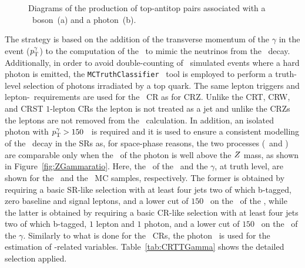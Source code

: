 		\begin{figure}[htpb]
		  \centering
		    \caption{Diagrams of the production of top-antitop pairs associated with a \Zboson\ boson~(a) and a photon~(b).}
		    \label{fig:ttZttGamma}
		\end{figure}

		The strategy is based on the addition of the transverse momentum of the $\gamma$ in the event ($p_{\mathrm{T}}^{\gamma}$) to the computation of the \met\ to mimic the neutrinos from the \Zboson\ decay. Additionally, in order to avoid double-counting of \ttbar\ simulated events where a hard photon is emitted, the \verb+MCTruthClassifier+~\cite{MCTruthClassifier} tool is employed to perform a truth-level selection of photons irradiated by a top quark. The same lepton triggers and lepton-\pt\ requirements are used for the \ttgamma\ \ac{CR} as for CRZ. Unlike the CRT, CRW, and CRST $1$-lepton \acp{CR} the lepton is not treated as a jet and unlike the CRZs the leptons are not removed from the \met\ calculation. In addition, an isolated photon with $p_{\mathrm{T}}^{\gamma} > 150$ \GeV\ is required and it is used to ensure a consistent modelling of the \Zboson\ decay in the \acp{SR} as, for space-phase reasons, the two processes (\ttZ\ and \ttgamma) are comparable only when the \pt\ of the photon is well above the $Z$ mass, as shown in Figure~\ref{fig:ZGammaratio}. Here, the \pt\ of the \Zboson\ and the $\gamma$, at truth level, are shown for the \ttZ\ and the \ttgamma\ \ac{MC} samples, respectively. The former is obtained by requiring a basic \ac{SR}-like selection with at least four jets two of which b-tagged, zero baseline and signal leptons, and a lower cut of $150$ \GeV\ on the \pt\ of the \Zboson, while the latter is obtained by requiring a basic \ac{CR}-like selection with at least four jets two of which b-tagged, $1$ lepton and $1$ photon, and a lower cut of $150$ \GeV\ on the \pt\ of the $\gamma$. Similarly to what is done for the \Zboson\ \acp{CR}, the photon \pt\ is used for the estimation of \met-related variables. Table~\ref{tab:CRTTGamma} shows the detailed selection applied. 


